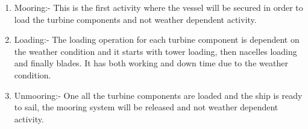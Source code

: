 \begin{enumerate}
\item Mooring:- This is the first activity where the vessel will be secured in order to load the turbine components and not weather dependent activity.
\item Loading:- The loading operation for each turbine component is dependent on the weather condition and it starts with tower loading, then nacelles loading and finally blades. It has both working and down time due to the weather condition.
\item Unmooring:- One all the turbine components are loaded and the ship is ready to sail, the mooring system will be released and not weather dependent activity.
\end{enumerate}